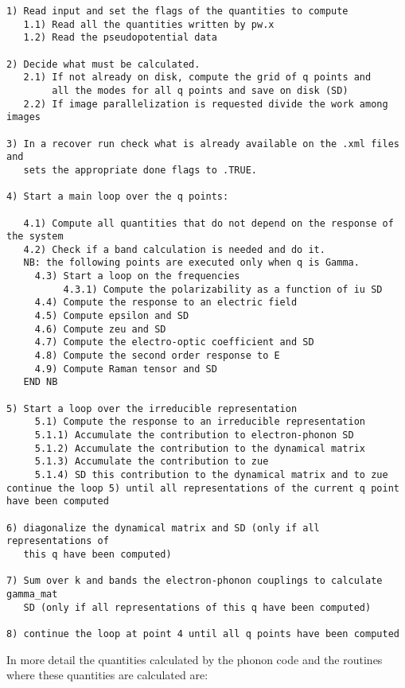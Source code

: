 \documentclass[12pt,a4paper]{article}
\begin{document}
\begin{verbatim}
1) Read input and set the flags of the quantities to compute
   1.1) Read all the quantities written by pw.x
   1.2) Read the pseudopotential data

2) Decide what must be calculated.
   2.1) If not already on disk, compute the grid of q points and 
        all the modes for all q points and save on disk (SD)
   2.2) If image parallelization is requested divide the work among images

3) In a recover run check what is already available on the .xml files and
   sets the appropriate done flags to .TRUE.

4) Start a main loop over the q points:

   4.1) Compute all quantities that do not depend on the response of the system
   4.2) Check if a band calculation is needed and do it.
   NB: the following points are executed only when q is Gamma.
     4.3) Start a loop on the frequencies
          4.3.1) Compute the polarizability as a function of iu SD
     4.4) Compute the response to an electric field 
     4.5) Compute epsilon and SD
     4.6) Compute zeu and SD
     4.7) Compute the electro-optic coefficient and SD
     4.8) Compute the second order response to E
     4.9) Compute Raman tensor and SD
   END NB

5) Start a loop over the irreducible representation 
     5.1) Compute the response to an irreducible representation
     5.1.1) Accumulate the contribution to electron-phonon SD
     5.1.2) Accumulate the contribution to the dynamical matrix 
     5.1.3) Accumulate the contribution to zue 
     5.1.4) SD this contribution to the dynamical matrix and to zue
continue the loop 5) until all representations of the current q point
have been computed

6) diagonalize the dynamical matrix and SD (only if all representations of 
   this q have been computed)

7) Sum over k and bands the electron-phonon couplings to calculate gamma_mat
   SD (only if all representations of this q have been computed)

8) continue the loop at point 4 until all q points have been computed

\end{verbatim}

In more detail the quantities calculated by the phonon code and
the routines where these quantities are calculated are:
\end{document}
